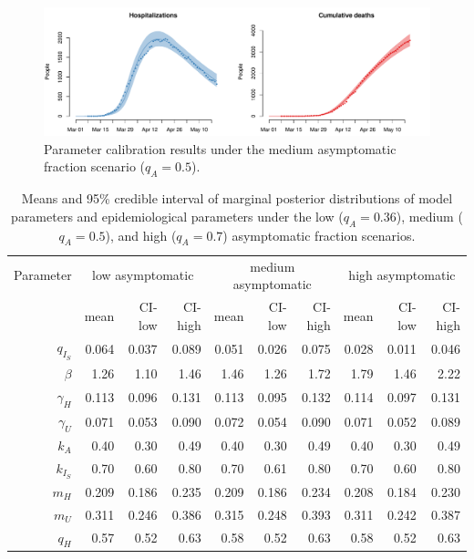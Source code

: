 \documentclass[11pt]{article}
\begin{document}
\begin{figure} %
	\centering
	\includegraphics[width=.8\textwidth]{figures/calibration.pdf}
	\caption{Parameter calibration results under the medium asymptomatic fraction scenario ($q_A = 0.5$).}
	\label{fig:fit}
\end{figure}




\begin{table}[!htb]
	\centering
	\caption{Means and 95\% credible interval of marginal posterior distributions of model parameters and epidemiological parameters under the low ($q_A = 0.36$), medium ($q_A = 0.5$), and high ($q_A = 0.7$) asymptomatic fraction scenarios.}
	\vspace{.5em}
	\begin{tabular}{r|rrr|rrr|rrr}
		\toprule
		Parameter & \multicolumn{3}{c}{low asymptomatic} & \multicolumn{3}{c}{medium asymptomatic} & \multicolumn{3}{c}{high asymptomatic} \\
		{} & mean & CI-low & CI-high & mean & CI-low & CI-high & mean & CI-low & CI-high \\ 
		\hline
				$q_{I_S}$ & 0.064 & 0.037 & 0.089 & 0.051 & 0.026 & 0.075 & 0.028 & 0.011 & 0.046 \\ 
				$\beta$ & 1.26 & 1.10 & 1.46 & 1.46 & 1.26 & 1.72 & 1.79 & 1.46 & 2.22 \\ 
				$\gamma_H$ & 0.113 & 0.096 & 0.131 & 0.113 & 0.095 & 0.132 & 0.114 & 0.097 & 0.131 \\ 
				$\gamma_U$ & 0.071 & 0.053 & 0.090 & 0.072 & 0.054 & 0.090 & 0.071 & 0.052 & 0.089 \\ 
				$k_A$ & 0.40 & 0.30 & 0.49 & 0.40 & 0.30 & 0.49 & 0.40 & 0.30 & 0.49 \\ 
				$k_{I_S}$ & 0.70 & 0.60 & 0.80 & 0.70 & 0.61 & 0.80 & 0.70 & 0.60 & 0.80 \\ 
				$m_H$ & 0.209 & 0.186 & 0.235 & 0.209 & 0.186 & 0.234 & 0.208 & 0.184 & 0.230 \\ 
				$m_U$ & 0.311 & 0.246 & 0.386 & 0.315 & 0.248 & 0.393 & 0.311 & 0.242 & 0.387 \\ 
				$q_H$ & 0.57 & 0.52 & 0.63 & 0.58 & 0.52 & 0.63 & 0.58 & 0.52 & 0.63 \\ 

\end{tabular}
\end{table}
\end{document}
